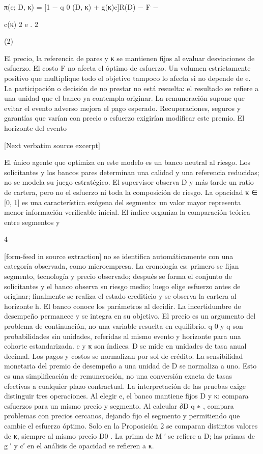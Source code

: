 \documentclass[10pt]{article}
\begin{document}
\begin{ReviewVerbatim}
π(e; D, κ) = [1 − q 0 (D, κ) + g(κ)e]R(D) − F −

c(κ) 2
e .
2

(2)

El precio, la referencia de pares y κ se mantienen ﬁjos al evaluar desviaciones de esfuerzo.
El costo F no afecta el óptimo de esfuerzo. Un volumen estrictamente positivo que multiplique
todo el objetivo tampoco lo afecta si no depende de e. La participación o decisión de no prestar
no está resuelta: el resultado se reﬁere a una unidad que el banco ya contempla originar. La remuneración supone que evitar el evento adverso mejora el pago esperado. Recuperaciones, seguros y
garantías que varían con precio o esfuerzo exigirían modiﬁcar este premio. El horizonte del evento

[Next verbatim source excerpt]

El único agente que optimiza en este modelo es un banco neutral al riesgo. Los solicitantes y los
bancos pares determinan una calidad y una referencia reducidas; no se modela su juego estratégico.
El supervisor observa D y más tarde un ratio de cartera, pero no el esfuerzo ni toda la composición de
riesgo. La opacidad κ ∈ [0, 1] es una característica exógena del segmento: un valor mayor representa
menor información veriﬁcable inicial. El índice organiza la comparación teórica entre segmentos y

4


[form-feed in source extraction]
no se identiﬁca automáticamente con una categoría observada, como microempresa.
La cronología es: primero se ﬁjan segmento, tecnología y precio observado; después se forma el
conjunto de solicitantes y el banco observa su riesgo medio; luego elige esfuerzo antes de originar;
ﬁnalmente se realiza el estado crediticio y se observa la cartera al horizonte h. El banco conoce los
parámetros al decidir. La incertidumbre de desempeño permanece y se integra en su objetivo. El
precio es un argumento del problema de continuación, no una variable resuelta en equilibrio.
q 0 y q son probabilidades sin unidades, referidas al mismo evento y horizonte para una cohorte
estandarizada. e y κ son índices. D se mide en unidades de tasa anual decimal. Los pagos y costos
se normalizan por sol de crédito. La sensibilidad monetaria del premio de desempeño a una unidad
de D se normaliza a uno. Esto es una simpliﬁcación de remuneración, no una conversión exacta de
tasas efectivas a cualquier plazo contractual.
La interpretación de las pruebas exige distinguir tres operaciones. Al elegir e, el banco mantiene
ﬁjos D y κ: compara esfuerzos para un mismo precio y segmento. Al calcular ∂D q ∗ , compara
problemas con precios cercanos, dejando ﬁjo el segmento y permitiendo que cambie el esfuerzo
óptimo. Solo en la Proposición 2 se comparan distintos valores de κ, siempre al mismo precio D0 .
La prima de M ′ se reﬁere a D; las primas de g ′ y c′ en el análisis de opacidad se reﬁeren a κ.


\end{ReviewVerbatim}
\end{document}
